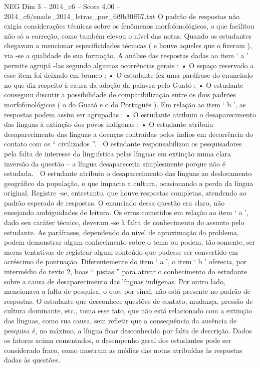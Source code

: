\begin{textsample}{NEG Dim 3 – 2014\_c6 – Score 4.00 – 2014\_c6/enade\_2014\_letras\_por\_6f9b30ff67.txt}
O padrão de respostas não exigia considerações técnicas sobre os fenômenos morfofonológicos, o que facilitou não só a correção, como também elevou o nível das notas.
Quando os estudantes chegavam a mencionar especificidades técnicas ( e houve aqueles que o fizeram ), via -se a qualidade de sua formação.
A análise das respostas dadas ao item ‘ a ’ permite agrupá -las segundo algumas ocorrências gerais : • O espaço reservado a esse item foi deixado em branco ; • O estudante fez uma paráfrase do enunciado no que diz respeito à causa da adoção da palavra pelo Guató ; • O estudante conseguiu discutir a possibilidade de compatibilização entre os dois padrões morfofonológicos ( o do Guató e o do Português ).
Em relação ao item ‘ b ’, as respostas podem assim ser agrupadas : • O estudante atribuiu o desaparecimento das línguas à extinção dos povos indígenas ; • O estudante atribuiu desaparecimento das línguas a doenças contraídas pelos índios em decorrência do contato com os “ civilizados ”.  O estudante responsabilizou os pesquisadores pela falta de interesse da linguística pelas línguas em extinção numa clara inversão da questão – a língua desapareceria simplesmente porque não é estudada.  O estudante atribuiu o desaparecimento das línguas ao deslocamento geográfico da população, o que impacta a cultura, ocasionando a perda da língua original.
Registre -se, entretanto, que houve respostas completas, atendendo ao padrão esperado de respostas.
O enunciado dessa questão era claro, não ensejando ambiguidades de leitura.
Os erros cometidos em relação ao item ‘ a ’, dado seu caráter técnico, deveram -se à falta de conhecimento do assunto pelo estudante.
As paráfrases, dependendo do nível de aproximação do problema, podem demonstrar algum conhecimento sobre o tema ou podem, tão somente, ser meras tentativas de registrar algum conteúdo que pudesse ser convertido em acréscimo de pontuação.
Diferentemente do item ‘ a ’, o item ‘ b ’ oferecia, por intermédio do texto 2, boas “ pistas ” para ativar o conhecimento do estudante sobre a causa de desaparecimento das línguas indígenas.
Por outro lado, mencionava a falta de pesquisa, o que, por sinal, não está presente no padrão de respostas.
O estudante que desconhece questões de contato, mudança, pressão de cultura dominante, etc., toma esse fato, que não está relacionado com a extinção das línguas, como sua causa, sem refletir que a consequência da ausência de pesquisa é, no máximo, a língua ficar desconhecida por falta de descrição.
Dados os fatores acima comentados, o desempenho geral dos estudantes pode ser considerado fraco, como mostram as médias das notas atribuídas às respostas dadas às questões.

\end{textsample}
